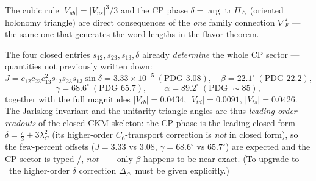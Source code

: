 \documentclass[11pt,a4paper]{article}
\newcommand{\lamC}{\lambda_C}
\theoremstyle{definition}
\begin{document}
\noindent The cubic rule $|V_{ub}|=|V_{us}|^3/3$ and the CP phase $\delta=\arg\operatorname{tr}\Pi_\triangle$
(oriented holonomy triangle) are direct consequences of the \emph{one} family connection
$\nabla_F^\star$ --- the same one that generates the word-lengths in the flavor theorem.

\begin{winbox}
The four closed entries $s_{12},s_{23},s_{13},\delta$ already \emph{determine} the whole CP sector ---
quantities not previously written down:
\[
  J=c_{12}c_{23}c_{13}^2 s_{12}s_{23}s_{13}\sin\delta=3.33\times10^{-5}\ (\text{PDG }3.08),\quad
  \beta=22.1^\circ\ (\text{PDG }22.2),
\]
\[
  \gamma=68.6^\circ\ (\text{PDG }65.7),\qquad \alpha=89.2^\circ\ (\text{PDG }\sim85),
\]
together with the full magnitudes $|V_{cb}|=0.0434$, $|V_{td}|=0.0091$, $|V_{ts}|=0.0426$. The Jarlskog
invariant and the unitarity-triangle angles are thus \emph{leading-order readouts} of the closed CKM
skeleton: the CP phase is the leading closed form $\delta=\tfrac\pi3+3\lamC^2$ (its higher-order $C_6$-transport
correction is \emph{not} in closed form), so the few-percent offsets ($J{=}3.33$ vs $3.08$, $\gamma{=}68.6^\circ$
vs $65.7^\circ$) are expected and the CP sector is typed \mE/\mC, \emph{not} \mE\ --- only $\beta$ happens to be
near-exact. (To upgrade to \mE\ the higher-order $\delta$ correction $\Delta_\triangle$ must be given
explicitly.)
\end{winbox}
\end{document}
